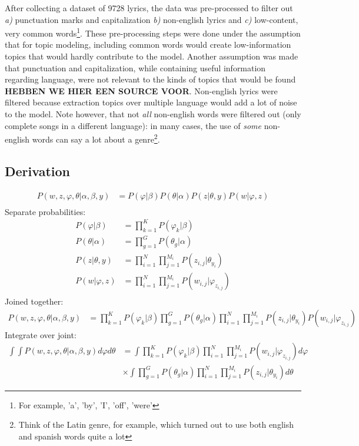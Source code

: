 After collecting a dataset of 9728 lyrics, the data was pre-processed to filter out \textit{a)} punctuation marks and capitalization \textit{b)} non-english lyrics and \textit{c)} low-content, very common words\footnote{For example, 'a', 'by', 'I', 'off', 'were'}. These pre-processing steps were done under the assumption that for topic modeling, including common words would create low-information topics that would hardly contribute to the model. Another assumption was made that punctuation and capitalization, while containing useful information regarding language, were not relevant to the kinds of topics that would be found \textbf{HEBBEN WE HIER EEN SOURCE VOOR}. Non-english lyrics were filtered because extraction topics over multiple language would add a lot of noise to the model. Note however, that not \textit{all} non-english words were filtered out (only complete songs in a different language): in many cases, the use of \textit{some} non-english words can say a lot about a genre\footnote{Think of the Latin genre, for example, which turned out to use both english and spanish words quite a lot}. 

\subsection{Derivation}\label{ref:derivation}
\begin{align}
P(w, z, \varphi, \theta | \alpha, \beta, y) &= P(\varphi | \beta)P(\theta | \alpha)P(z | \theta, y)P(w | \varphi, z)\\
\end{align}
Separate probabilities:
\begin{align}
P(\varphi | \beta) &= \prod\limits_{k=1}^K P(\varphi_k|\beta)\\
P(\theta | \alpha) &= \prod\limits_{g=1}^G P(\theta_g|\alpha)\\
P(z | \theta, y) &= \prod\limits_{i=1}^N \prod\limits_{j=1}^{M_i} P(z_{i,j}|\theta_{y_i})\\
P(w | \varphi, z) &= \prod\limits_{i=1}^N \prod\limits_{j=1}^{M_i} P(w_{i,j}|\varphi_{z_{i,j}})\\
\end{align}
Joined together:
\begin{align}
P(w, z, \varphi, \theta | \alpha, \beta, y) &= \prod\limits_{k=1}^K P(\varphi_k|\beta) \prod\limits_{g=1}^G P(\theta_g|\alpha) \prod^N_{i=1}\prod^{M_i}_{j=1} P(z_{i,j}|\theta_{y_i}) P(w_{i,j}|\varphi_{z_{i,j}})
\end{align}
Integrate over joint:
\begin{align}
\int \int P(w, z, \varphi, \theta | \alpha, \beta, y) d\varphi d\theta &= \int \prod\limits_{k=1}^K P(\varphi_k|\beta) \prod^N_{i=1}\prod^{M_i}_{j=1} P(w_{i,j}|\varphi_{z_{i,j}}) d\varphi\\
&\times \int \prod\limits_{g=1}^G P(\theta_g|\alpha) \prod^N_{i=1}\prod^{M_i}_{j=1} P(z_{i,j}|\theta_{y_i}) d\theta
\end{align}
